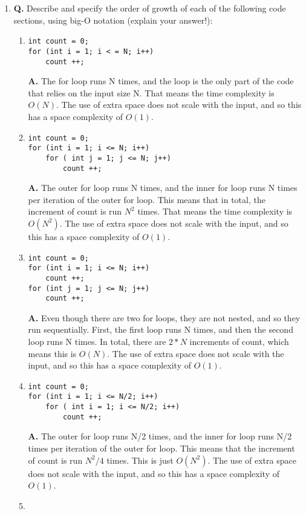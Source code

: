 \documentclass[12pt]{article}
\begin{document}
\begin{enumerate}
  \item
  \textbf{Q.} Describe and specify the order of growth of each of the following code sections, using big-O notation (explain your answer!):
  \begin{enumerate}[label=(\alph*)]
  \item
  \begin{lstlisting}
int count = 0;
for (int i = 1; i < = N; i++)
	count ++;
  \end{lstlisting}
  \textbf{A.} The for loop runs N times, and the loop is the only part of the code that relies on the input size N. That means the time complexity is \(O(N)\). The use of extra space does not scale with the input, and so this has a space complexity of \(O(1)\).
  \item
  \begin{lstlisting}
int count = 0;
for (int i = 1; i <= N; i++)
	for ( int j = 1; j <= N; j++)
		count ++;
  \end{lstlisting}
  \textbf{A.} The outer for loop runs N times, and the inner for loop runs N times per iteration of the outer for loop. This means that in total, the increment of count is run \(N^2\) times. That means the time complexity is \(O(N^2)\). The use of extra space does not scale with the input, and so this has a space complexity of \(O(1)\).
  \item
  \begin{lstlisting}
int count = 0;
for (int i = 1; i <= N; i++)
	count ++;
for (int j = 1; j <= N; j++)
	count ++;
  \end{lstlisting}
  \textbf{A.} Even though there are two for loops, they are not nested, and so they run sequentially. First, the first loop runs N times, and then the second loop runs N times. In total, there are \(2*N\) increments of count, which means this is \(O(N)\). The use of extra space does not scale with the input, and so this has a space complexity of \(O(1)\).
  \item
  \begin{lstlisting}
int count = 0;
for (int i = 1; i <= N/2; i++)
	for ( int i = 1; i <= N/2; i++)
		count ++;    
  \end{lstlisting}
  \textbf{A.} The outer for loop runs N/2 times, and the inner for loop runs N/2 times per iteration of the outer for loop. This means that the increment of count is run \(N^2/4\) times. This is just \(O(N^2)\). The use of extra space does not scale with the input, and so this has a space complexity of \(O(1)\).
  \item
  \begin{lstlisting}

\end{lstlisting}
\end{enumerate}
\end{enumerate}
\end{document}
